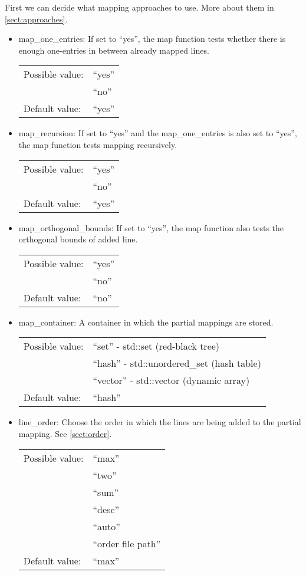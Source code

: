 First we can decide what mapping approaches to use. More about them in \autoref{sect:approaches}.
\begin{itemize}
\item map\_one\_entries: If set to ``yes'', the map function  tests whether there is enough one-entries in between already mapped lines.

\begin{tabular}{ll}
Possible value: & ``yes'' \\
& ``no'' \\
Default value: & ``yes''
\end{tabular}

\item map\_recursion: If set to ``yes'' and the map\_one\_entries is also set to ``yes'', the map function tests mapping recursively.

\begin{tabular}{ll}
Possible value: & ``yes'' \\
& ``no'' \\
Default value: & ``yes''
\end{tabular}

\item map\_orthogonal\_bounds: If set to ``yes'', the map function also tests the orthogonal bounds of added line.

\begin{tabular}{ll}
Possible value: & ``yes'' \\
& ``no'' \\
Default value: & ``no''
\end{tabular}
\end{itemize}

\begin{itemize}
\item map\_container: A container in which the partial mappings are stored.

\begin{tabular}{ll}
Possible value: & ``set'' - std::set (red-black tree) \\
& ``hash'' - std::unordered\_set (hash table) \\
& ``vector'' - std::vector (dynamic array) \\
Default value: & ``hash''
\end{tabular}

\item line\_order: Choose the order in which the lines are being added to the partial mapping. See \autoref{sect:order}.

\begin{tabular}{ll}
Possible value: & ``max'' \\
& ``two'' \\
& ``sum'' \\
& ``desc'' \\
& ``auto'' \\
& ``order file path'' \\
Default value: & ``max''
\end{tabular}

\end{itemize}
